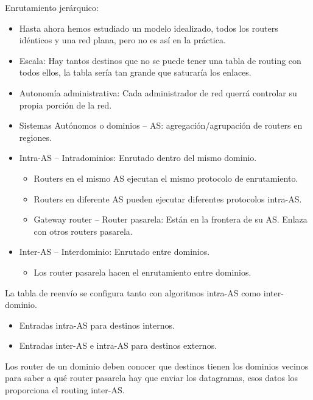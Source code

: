 \documentclass[12pt, twoside, openright]{report} %
\begin{document}
	Enrutamiento jerárquico:

    \begin{itemize}
    \item
      Hasta ahora hemos estudiado un modelo idealizado, todos los
      routers idénticos y una red plana, pero no es así en la práctica.
    \item
      Escala: Hay tantos destinos que no se puede tener una tabla de
      routing con todos ellos, la tabla sería tan grande que saturaría
      los enlaces.
    \item
      Autonomía administrativa: Cada administrador de red querrá
      controlar su propia porción de la red.
    \item
      Sistemas Autónomos o dominios -- AS: agregación/agrupación de
      routers en regiones.
    \item
      Intra-AS -- Intradominios: Enrutado dentro del mismo dominio.

      \begin{itemize}
      \item
        Routers en el mismo AS ejecutan el mismo protocolo de
        enrutamiento.
      \item
        Routers en diferente AS pueden ejecutar diferentes protocolos
        intra-AS.
      \item
        Gateway router -- Router pasarela: Están en la frontera de su
        AS. Enlaza con otros routers pasarela.
      \end{itemize}
    \item
      Inter-AS -- Interdominio: Enrutado entre dominios.

      \begin{itemize}
      \item
        Los router pasarela hacen el enrutamiento entre dominios.
      \end{itemize}
    \end{itemize}

	La tabla de reenvío se configura tanto con algoritmos intra-AS como
    inter-dominio.

    \begin{itemize}
    \item
      Entradas intra-AS para destinos internos.
    \item
      Entradas inter-AS e intra-AS para destinos externos.
    \end{itemize}

	Los router de un dominio deben conocer que destinos tienen los
    dominios vecinos para saber a qué router pasarela hay que enviar los
    datagramas, esos datos los proporciona el routing inter-AS.
\end{document}
